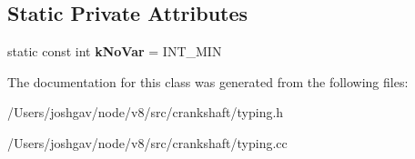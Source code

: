 \subsection*{Static Private Attributes}
\begin{DoxyCompactItemize}
\item 
static const int {\bfseries k\+No\+Var} = I\+N\+T\+\_\+\+M\+IN\hypertarget{classv8_1_1internal_1_1_ast_typer_a65e8878b7e5b2cdb361d38dd50fa1310}{}\label{classv8_1_1internal_1_1_ast_typer_a65e8878b7e5b2cdb361d38dd50fa1310}

\end{DoxyCompactItemize}


The documentation for this class was generated from the following files\+:\begin{DoxyCompactItemize}
\item 
/\+Users/joshgav/node/v8/src/crankshaft/typing.\+h\item 
/\+Users/joshgav/node/v8/src/crankshaft/typing.\+cc\end{DoxyCompactItemize}
